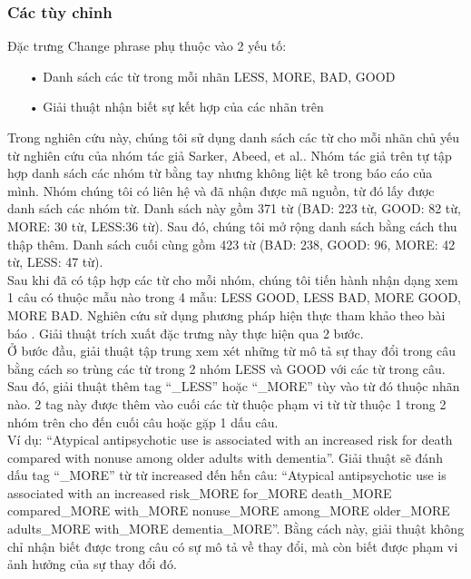 \subsubsection*{Các tùy chỉnh}
Đặc trưng Change phrase phụ thuộc vào 2 yếu tố:
\begin{itemize}[noitemsep]
\item[•] Danh sách các từ trong mỗi nhãn LESS, MORE, BAD, GOOD
\item[•] Giải thuật nhận biết sự kết hợp của các nhãn trên
\end{itemize}
Trong nghiên cứu này, chúng tôi sử dụng danh sách các từ cho mỗi nhãn chủ yếu từ nghiên cứu của nhóm tác giả Sarker, Abeed, et al.\cite{sarker2011outcome}. Nhóm tác giả trên tự tập hợp danh sách các nhóm từ bằng tay nhưng không liệt kê trong báo cáo của mình. Nhóm chúng tôi có liên hệ và đã nhận được mã nguồn, từ đó lấy được danh sách các nhóm từ. Danh sách này gồm 371 từ (BAD: 223 từ, GOOD: 82 từ, MORE: 30 từ, LESS:36 từ). Sau đó, chúng tôi mở rộng danh sách bằng cách thu thập thêm. Danh sách cuối cùng gồm 423 từ (BAD: 238, GOOD: 96, MORE: 42 từ, LESS: 47 từ).\\

Sau khi đã có tập hợp các từ cho mỗi nhóm, chúng tôi tiến hành nhận dạng xem 1 câu có thuộc mẫu nào trong 4 mẫu: LESS GOOD, LESS BAD, MORE GOOD, MORE BAD. Nghiên cứu sử dụng phương pháp hiện thực tham khảo theo bài báo \cite{niu2005analysis}. Giải thuật trích xuất đặc trưng này thực hiện qua 2 bước.\\

Ở bước đầu, giải thuật tập trung xem xét những từ mô tả sự thay đổi trong câu bằng cách so trùng các từ trong 2 nhóm LESS và GOOD với các từ trong câu. Sau đó, giải thuật thêm tag ``\_LESS'' hoặc ``\_MORE'' tùy vào từ đó thuộc nhãn nào. 2 tag này được thêm vào cuối các từ thuộc phạm vi từ từ thuộc 1 trong 2 nhóm trên cho đến cuối câu hoặc gặp 1 dấu câu. \\

Ví dụ: “Atypical antipsychotic use is associated with an increased risk for death compared with nonuse among older adults with dementia”. Giải thuật sẽ đánh dấu tag ``\_MORE'' từ từ increased đến hến câu: ``Atypical antipsychotic use is associated with an increased risk\_MORE for\_MORE death\_MORE compared\_MORE with\_MORE nonuse\_MORE among\_MORE older\_MORE adults\_MORE with\_MORE dementia\_MORE''. Bằng cách này, giải thuật không chỉ nhận biết được trong câu có sự mô tả về thay đổi, mà còn biết được phạm vi ảnh hưởng của sự thay đổi đó.

